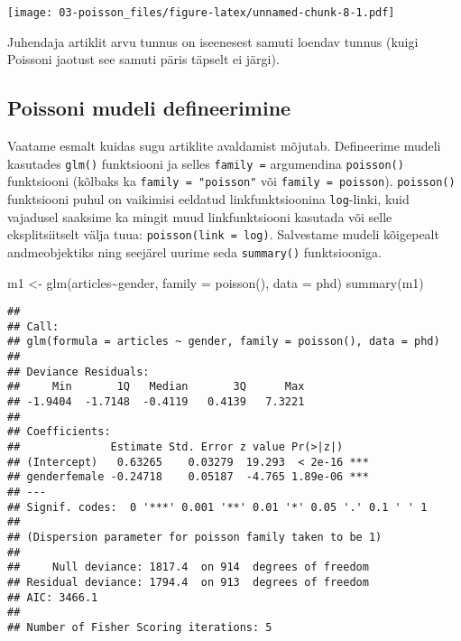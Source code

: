 \documentclass[
]{book}
\newenvironment{Shaded}{\begin{snugshade}}{\end{snugshade}}
\newcommand{\AttributeTok}[1]{\textcolor[rgb]{0.77,0.63,0.00}{#1}}
\newcommand{\FunctionTok}[1]{\textcolor[rgb]{0.00,0.00,0.00}{#1}}
\newcommand{\NormalTok}[1]{#1}
\newcommand{\OtherTok}[1]{\textcolor[rgb]{0.56,0.35,0.01}{#1}}
\newcommand{\SpecialCharTok}[1]{\textcolor[rgb]{0.00,0.00,0.00}{#1}}
\begin{document}
\begin{Shaded}
\end{Shaded}

\texttt{[image: 03-poisson\_files/figure-latex/unnamed-chunk-8-1.pdf]}

Juhendaja artiklit arvu tunnus on iseenesest samuti loendav tunnus (kuigi Poissoni jaotust see samuti päris täpselt ei järgi).

\hypertarget{poissoni-mudeli-defineerimine}{%
\subsection{Poissoni mudeli defineerimine}\label{poissoni-mudeli-defineerimine}}

Vaatame esmalt kuidas sugu artiklite avaldamist mõjutab. Defineerime mudeli kasutades \texttt{glm()} funktsiooni ja selles \texttt{family\ =} argumendina \texttt{poisson()} funktsiooni (kõlbaks ka \texttt{family\ =\ "poisson"} või \texttt{family\ =\ poisson}). \texttt{poisson()} funktsiooni puhul on vaikimisi eeldatud linkfunktsioonina \texttt{log}-linki, kuid vajadusel saaksime ka mingit muud linkfunktsiooni kasutada või selle eksplitsiitselt välja tuua: \texttt{poisson(link\ =\ \textquotesingle{}log\textquotesingle{})}. Salvestame mudeli kõigepealt andmeobjektiks ning seejärel uurime seda \texttt{summary()} funktsiooniga.

\begin{Shaded}
\begin{Highlighting}[]
\NormalTok{m1 }\OtherTok{\textless{}{-}} \FunctionTok{glm}\NormalTok{(articles}\SpecialCharTok{\textasciitilde{}}\NormalTok{gender, }\AttributeTok{family =} \FunctionTok{poisson}\NormalTok{(), }\AttributeTok{data =}\NormalTok{ phd)}
\FunctionTok{summary}\NormalTok{(m1)}
\end{Highlighting}
\end{Shaded}

\begin{verbatim}
## 
## Call:
## glm(formula = articles ~ gender, family = poisson(), data = phd)
## 
## Deviance Residuals: 
##     Min       1Q   Median       3Q      Max  
## -1.9404  -1.7148  -0.4119   0.4139   7.3221  
## 
## Coefficients:
##              Estimate Std. Error z value Pr(>|z|)    
## (Intercept)   0.63265    0.03279  19.293  < 2e-16 ***
## genderfemale -0.24718    0.05187  -4.765 1.89e-06 ***
## ---
## Signif. codes:  0 '***' 0.001 '**' 0.01 '*' 0.05 '.' 0.1 ' ' 1
## 
## (Dispersion parameter for poisson family taken to be 1)
## 
##     Null deviance: 1817.4  on 914  degrees of freedom
## Residual deviance: 1794.4  on 913  degrees of freedom
## AIC: 3466.1
## 
## Number of Fisher Scoring iterations: 5
\end{verbatim}
\end{document}
